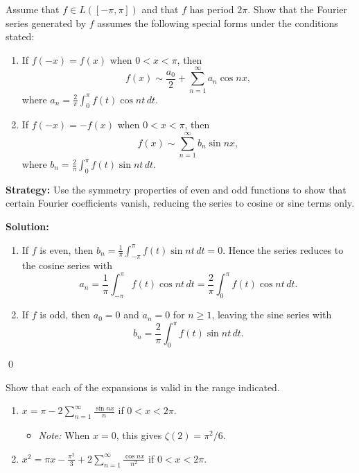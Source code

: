 \begin{problembox}
Assume that $f \in L([-\pi, \pi])$ and that $f$ has period $2\pi$. Show that the Fourier series generated by $f$ assumes the following special forms under the conditions stated:
\begin{enumerate}[label=(\alph*)]
\item If $f(-x) = f(x)$ when $0 < x < \pi$, then
\[
f(x) \sim \frac{a_0}{2} + \sum_{n=1}^\infty a_n \cos nx,
\]
where $a_n = \frac{2}{\pi} \int_0^\pi f(t) \cos nt \, dt$.
\item If $f(-x) = -f(x)$ when $0 < x < \pi$, then
\[
f(x) \sim \sum_{n=1}^\infty b_n \sin nx,
\]
where $b_n = \frac{2}{\pi} \int_0^\pi f(t) \sin nt \, dt$.
\end{enumerate}
\end{problembox}

\noindent\textbf{Strategy:} Use the symmetry properties of even and odd functions to show that certain Fourier coefficients vanish, reducing the series to cosine or sine terms only.

\bigskip\noindent\textbf{Solution:}
\begin{enumerate}[label=(\alph*)]
\item If $f$ is even, then $b_n=\tfrac{1}{\pi}\int_{-\pi}^{\pi} f(t)\sin nt\,dt=0$. Hence the series reduces to the cosine series with
\[a_n=\frac{1}{\pi}\int_{-\pi}^{\pi} f(t)\cos nt\,dt=\frac{2}{\pi}\int_0^{\pi} f(t)\cos nt\,dt.\]
\item If $f$ is odd, then $a_0=0$ and $a_n=0$ for $n\ge1$, leaving the sine series with
\[b_n=\frac{2}{\pi}\int_0^{\pi} f(t)\sin nt\,dt.\]
\end{enumerate}\qed


\begin{problembox}
Show that each of the expansions is valid in the range indicated.
\begin{enumerate}[label=(\alph*)]
\item $x = \pi - 2 \sum_{n=1}^\infty \frac{\sin nx}{n}$ if $0 < x < 2\pi$.
\begin{itemize}
\item \textit{Note:} When $x = 0$, this gives $\zeta(2) = \pi^2/6$.
\end{itemize}
\item $x^2 = \pi x - \frac{\pi^2}{3} + 2 \sum_{n=1}^\infty \frac{\cos nx}{n^2}$ if $0 < x < 2\pi$.
\end{enumerate}
\end{problembox}

